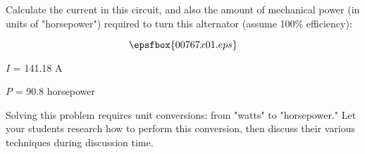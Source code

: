 

Calculate the current in this circuit, and also the amount of mechanical power (in units of "horsepower") required to turn this alternator (assume 100\% efficiency):

$$\epsfbox{00767x01.eps}$$







$I$ = 141.18 A

$P$ = 90.8 horsepower







Solving this problem requires unit conversions: from "watts" to "horsepower."  Let your students research how to perform this conversion, then discuss their various techniques during discussion time.




